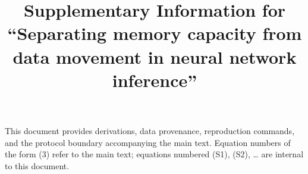 \documentclass[Numbered]{sn-jnl}
\begin{document}
\title{Supplementary Information for ``Separating memory capacity from data
movement in neural network inference''}

\author*[1]{ }

\maketitle

\noindent This document provides derivations, data provenance, reproduction
commands, and the protocol boundary accompanying the main text.
Equation numbers of the form (3) refer to the main text;
equations numbered (S1), (S2), \ldots{} are internal to this document.


\end{document}
